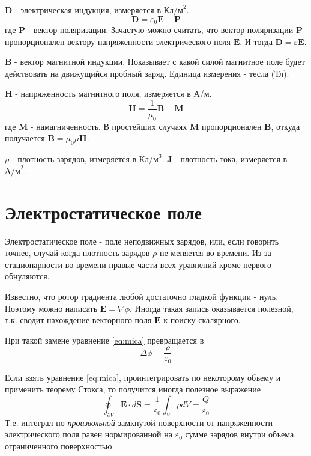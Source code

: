 \documentclass[a4paper,12pt]{article}
\numberwithin{equation}{section}
\begin{document}
$\bm{D}$ - электрическая индукция, измеряется в $\text{Кл/м}^2$.
\begin{equation}
    \bm{D} = \varepsilon_0 \bm{E} + \bm{P}
\end{equation}
где $\bm{P}$ - вектор поляризации.
Зачастую можно считать, что вектор поляризации $\bm{P}$ пропорционален вектору напряженности электрического поля $\bm{E}$.
И тогда $\bm{D} = \varepsilon \bm{E}$.

$\bm{B}$ - вектор магнитной индукции.
Показывает с какой силой магнитное поле будет действовать на движущийся пробный заряд.
Единица измерения - тесла (Тл).

$\bm{H}$ - напряженность магнитного поля, измеряется в А/м.
\begin{equation}
    \bm{H} = \frac{1}{\mu_0} \bm{B} - \bm{M}
\end{equation}
где $\bm{M}$ - намагниченность.
В простейших случаях $\bm{M}$ пропорционален $\bm{B}$, откуда получается $\bm{B} = \mu_0 \mu \bm{H}$.

$\rho$ - плотность зарядов, измеряется в $\text{Кл/м}^3$.
$\bm{J}$ - плотность тока, измеряется в $\text{А/м}^2$.




\section{Электростатическое поле}

Электростатическое поле - поле неподвижных зарядов, или, если говорить точнее, случай когда плотность зарядов $\rho$ не меняется во времени.
Из-за стационарности во времени правые части всех уравнений кроме первого обнуляются.

Известно, что ротор градиента любой достаточно гладкой функции - нуль.
Поэтому можно написать $\bm{E} = \nabla \phi$.
Иногда такая запись оказывается полезной, т.к. сводит нахождение векторного поля $\bm{E}$ к поиску скалярного.

При такой замене уравнение \ref{eq:mica} превращается в
\begin{equation}
    \Delta \phi = \frac{\rho}{\varepsilon_0}
\end{equation}

Если взять уравнение \ref{eq:mica}, проинтегрировать по некоторому объему и применить теорему Стокса, то получится иногда полезное выражение
\begin{equation}
    \label{eq:gauss}
    \oint_{\partial V} \bm{E} \cdot d\bm{S} = \frac{1}{\varepsilon_0} \int_{V} \rho dV = \frac{Q}{\varepsilon_0}
\end{equation}
Т.е. интеграл по \textit{произвольной} замкнутой поверхности от напряженности электрического поля равен нормированной на $\varepsilon_0$ сумме зарядов внутри объема ограниченного поверхностью.
\end{document}
